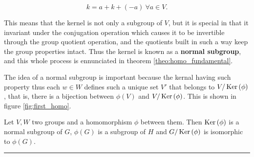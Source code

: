 \begin{equation} k = a + k + \left(-a\right)\ \forall a\in V. \end{equation}

	This means that the kernel is not only a subgroup of $V$, but it is special in that it invariant under the conjugation operation which causes it to be invertible through the group quotient operation, and the quotients built in such a way keep the group properties intact. Thus the kernel is known as a \textbf{normal subgroup}, and this whole process is ennunciated in theorem \ref{theo:homo_fundamental}.

	The idea of a normal subgroup is important because the kernal having such property thus each $w\in W$ defines such a unique set $V'$ that belongs to $V/\operatorname{Ker}\left(\phi\right)$, that is, there is a bijection between $\phi\left(V\right)$ and $V/\operatorname{Ker}\left(\phi\right)$. This is shown in figure \ref{fig:first_homo}.

\begin{theorem}\label{theo:homo_fundamental}
	Let $V,W$ two groups and a homomorphism $\phi$ between them. Then $\operatorname{Ker}\left(\phi\right)$ is a normal subgroup of $G$, $\phi\left(G\right)$ is a subgroup of $H$ and $G/\operatorname{Ker}\left(\phi\right)$ is isomorphic to $\phi\left(G\right)$.
\end{theorem}\vspace{3mm}\hrule\vspace{3mm}


